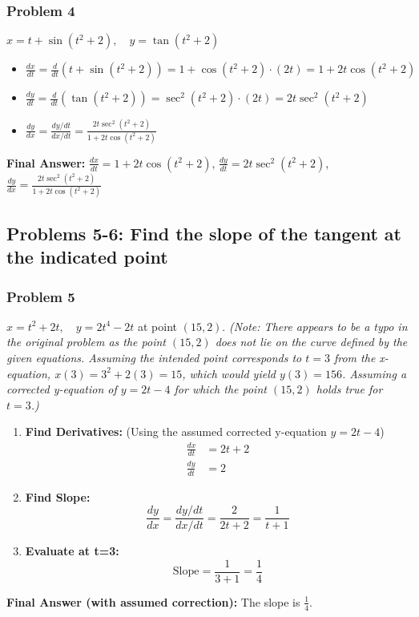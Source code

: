 \documentclass{article}
\begin{document}
\subsubsection{Problem 4}
$x = t + \sin(t^2 + 2), \quad y = \tan(t^2 + 2)$
\begin{itemize}
    \item $\frac{dx}{dt} = \frac{d}{dt}(t + \sin(t^2 + 2)) = 1 + \cos(t^2 + 2) \cdot (2t) = 1 + 2t\cos(t^2+2)$
    \item $\frac{dy}{dt} = \frac{d}{dt}(\tan(t^2 + 2)) = \sec^2(t^2 + 2) \cdot (2t) = 2t\sec^2(t^2+2)$
    \item $\frac{dy}{dx} = \frac{dy/dt}{dx/dt} = \frac{2t\sec^2(t^2+2)}{1 + 2t\cos(t^2+2)}$
\end{itemize}
\textbf{Final Answer:} $\frac{dx}{dt} = 1 + 2t\cos(t^2+2)$, $\frac{dy}{dt} = 2t\sec^2(t^2+2)$, $\frac{dy}{dx} = \frac{2t\sec^2(t^2+2)}{1 + 2t\cos(t^2+2)}$

\subsection{Problems 5-6: Find the slope of the tangent at the indicated point}

\subsubsection{Problem 5}
$x = t^2 + 2t, \quad y = 2t^4 - 2t$ at point $(15, 2)$.
\textit{(Note: There appears to be a typo in the original problem as the point $(15,2)$ does not lie on the curve defined by the given equations. Assuming the intended point corresponds to $t=3$ from the x-equation, $x(3) = 3^2+2(3)=15$, which would yield $y(3)=156$. Assuming a corrected y-equation of $y=2t-4$ for which the point $(15,2)$ holds true for $t=3$.)}
\begin{enumerate}
    \item \textbf{Find Derivatives:} (Using the assumed corrected y-equation $y=2t-4$)
    \begin{align*}
    \frac{dx}{dt} &= 2t+2 \\
    \frac{dy}{dt} &= 2
    \end{align*}
    \item \textbf{Find Slope:}
    \[ \frac{dy}{dx} = \frac{dy/dt}{dx/dt} = \frac{2}{2t+2} = \frac{1}{t+1} \]
    \item \textbf{Evaluate at t=3:}
    \[ \text{Slope} = \frac{1}{3+1} = \frac{1}{4} \]
\end{enumerate}
\textbf{Final Answer (with assumed correction):} The slope is $\frac{1}{4}$.
\end{document}
